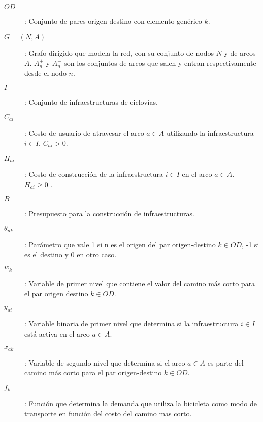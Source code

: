 \documentclass{article}
\begin{document}
  \begin{description}
    \item[$OD$]: Conjunto de pares origen destino con elemento genérico $k$.
    \item[$G=(N,A)$]: Grafo dirigido que modela la red, con su conjunto de nodos $N$ y de arcos $A$. $A_n^+$ y $A_n^-$ son los conjuntos de arcos que salen y entran respectivamente desde el nodo $n$.
    \item[$I$]: Conjunto de infraestructuras de ciclovías.
    \item[$C_{ai}$]: Costo de usuario de atravesar el arco $a \in A$ utilizando la infraestructura $i \in I$. $C_{ai} > 0$.
    \item[$H_{ai}$]: Costo de construcción de la infraestructura $i \in I$ en el arco $a \in A$. $H_{ai} \geq 0$ .
    \item[$B$]: Presupuesto para la construcción de infraestructuras.
    \item[$\theta_{nk}$]: Parámetro que vale 1 si n es el origen del par origen-destino $k \in OD$, -1 si es el destino y 0 en otro caso.
    \item[$w_k$]: Variable de primer nivel que contiene el valor del camino más corto para el par origen destino $k \in OD$.
    \item[$y_{ai}$]: Variable binaria de primer nivel que determina si la infraestructura $i \in I$ está activa en el arco $a \in A$.
    \item[$x_{ak}$]: Variable de segundo nivel que determina si el arco $a \in A$ es parte del camino más corto para el par origen-destino $k \in OD$.
    \item[$f_k$]: Función que determina la demanda que utiliza la bicicleta como modo de transporte en función del costo del camino mas corto.
  \end{description}
\end{document}
